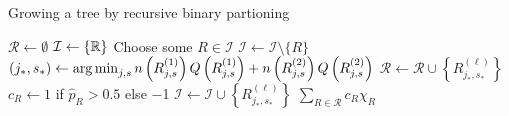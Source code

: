   \begin{algorithm}
    \caption{Growing a tree by recursive binary partioning} \label{alg:tree}
    \begin{algorithmic}[1]
        \State $\mathcal{R} \gets \emptyset$ 
        \State $\mathcal{I} \gets \{ \mathbb{R} \}$ 
          \State Choose some $R \in \mathcal{I}$
          \State $\mathcal{I} \gets \mathcal{I} \setminus \{ R \}$
          \State $(j_*, s_*) \gets \operatorname*{arg\,min}_{j, s} n\left(R_{j,s}^{(1)}\right) Q\left(R_{j,s}^{(1)}\right) + 
            n\left(R_{j,s}^{(2)}\right) Q\left(R_{j,s}^{(2)}\right)$ \label{alg:tree:split}
              \State $\mathcal{R} \gets \mathcal{R} \cup \left\{ R_{j_*, s_*}^{(\ell)} \right\}$
              \State $c_R \gets 1$ if $\hat{p}_R > \num{0.5}$ else \num{-1}
            \Else
              \State $\mathcal{I} \gets \mathcal{I} \cup \left\{ R_{j_*, s_*}^{(\ell)} \right\}$
            \EndIf
          \EndFor
        \EndWhile
        \State \Return $\sum_{R \in \mathcal{R}} c_R \chi_R$
      \EndFunction
    \end{algorithmic}
  \end{algorithm}